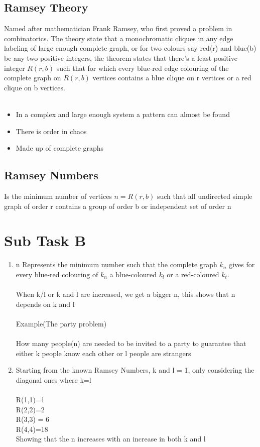 \documentclass{Assignment}
\begin{document}
\subsection*{Ramsey Theory}
Named after mathematician Frank Ramsey, who first proved a problem in combinatorics.
The theory state that a monochromatic cliques in any edge labeling of large enough complete graph, or for two colours say red(r) and blue(b) be any two positive integers, the theorem states that there's a least positive integer $R(r,b)$ such that for which every blue-red edge colouring of the complete graph on $R(r,b)$ vertices contains a blue clique on r vertices or a red clique on b vertices.\\\\
\begin{itemize}
	\item In a complex and large enough system a pattern can almost be found
	\item There is order in chaos
	\item Made up of complete graphs
\end{itemize}
\subsection*{Ramsey Numbers}
Is the minimum number of vertices $n = R(r,b)$ such that all undirected simple graph of order r contains a group of order b or independent set of order n
\newpage
\section*{Sub Task B}
\begin{enumerate}
	\item n Represents the minimum number such that the complete graph $k_n$ gives for every blue-red colouring of $k_n$ a blue-coloured $k_l$ or a red-coloured $k_t$.\\\\
	When k/l or k and l are increased, we get a bigger n, this shows that n depends on k and l\\\\
	Example(The party problem)\\\\
	How many people(n) are needed to be invited to a party to guarantee that either k people know each other or l people are strangers 
	\item 
	Starting from the known Ramsey Numbers, k and l = 1, only considering the diagonal ones where k=l\\\\
	R(1,1)=1\\
	R(2,2)=2\\
	R(3,3) = 6\\
	R(4,4)=18\\
Showing that the n increases with an increase in both k and l
\end{enumerate}
\end{document}
